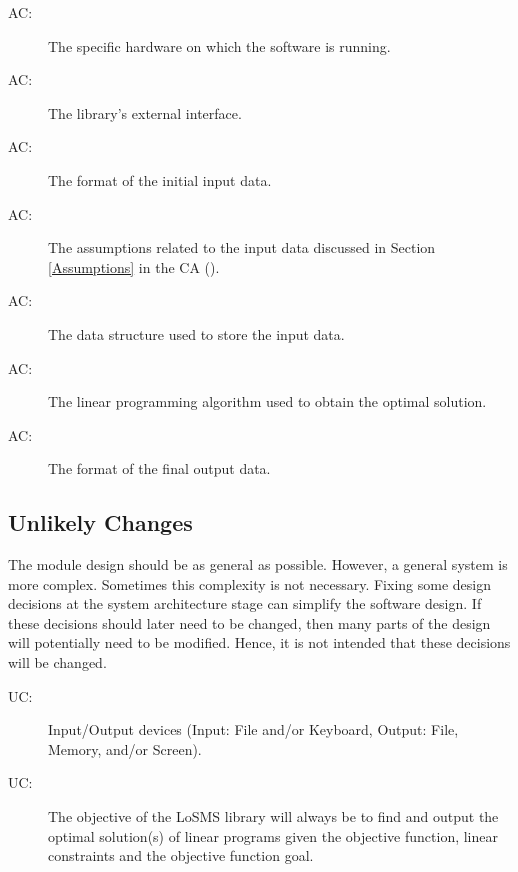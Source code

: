 \documentclass[12pt, titlepage]{article}
\newcounter{acnum}
\newcommand{\actheacnum}{AC\theacnum}
\newcounter{ucnum}
\newcommand{\uctheucnum}{UC\theucnum}
\newcommand{\famname}{LoSMS} %
\begin{document}
\begin{description}
\item[ \actheacnum \label{acHardware}:] The specific
  hardware on which the software is running.
  
\item[ \actheacnum \label{acInterface}:] The library's 
external interface.
  
\item[ \actheacnum \label{acInput}:] The format of the
  initial input data.
  
\item[ \actheacnum \label{acInputAssumption}:] The 
assumptions related to the input data discussed in Section \ref{Assumptions} in 
the CA (\cite{losms-ca}).

\item[ \actheacnum \label{acInputDataStructure}:] The 
data structure used to store the input data.

\item[ \actheacnum \label{acAlgorithm}:] The linear 
programming algorithm used to obtain the optimal solution.

\item[ \actheacnum \label{acOutput}:] The format of the 
final output data.
\end{description}

\subsection{Unlikely Changes} \label{SecUchange}

The module design should be as general as possible. However, a general system is
more complex. Sometimes this complexity is not necessary. Fixing some design
decisions at the system architecture stage can simplify the software design. If
these decisions should later need to be changed, then many parts of the design
will potentially need to be modified. Hence, it is not intended that these
decisions will be changed.

\begin{description}
\item[ \uctheucnum \label{ucIO}:] Input/Output devices
  (Input: File and/or Keyboard, Output: File, Memory, and/or Screen).

\item[ \uctheucnum \label{ucObjective}:] The objective of 
the \famname{} library will always be to find and output the optimal 
solution(s) of linear programs given the objective function, linear constraints 
and the objective function goal.
\end{description}
\end{document}
